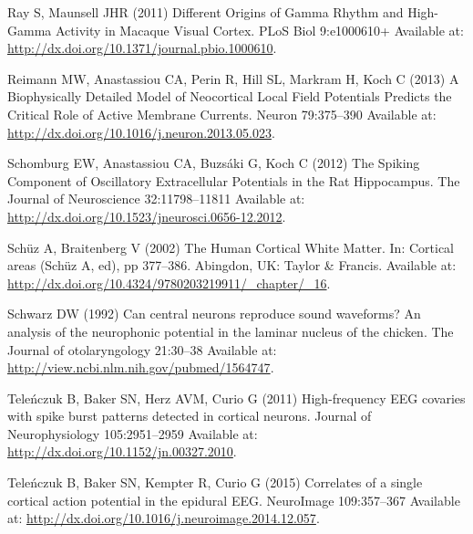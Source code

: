 \documentclass[]{article}
\begin{document}
\hypertarget{ref-Ray2011Different}{}
Ray S, Maunsell JHR (2011) Different Origins of Gamma Rhythm and
High-Gamma Activity in Macaque Visual Cortex. PLoS Biol 9:e1000610+
Available at: \url{http://dx.doi.org/10.1371/journal.pbio.1000610}.

\hypertarget{ref-Reimann2013Biophysically}{}
Reimann MW, Anastassiou CA, Perin R, Hill SL, Markram H, Koch C (2013) A
Biophysically Detailed Model of Neocortical Local Field Potentials
Predicts the Critical Role of Active Membrane Currents. Neuron
79:375--390 Available at:
\url{http://dx.doi.org/10.1016/j.neuron.2013.05.023}.

\hypertarget{ref-Schomburg2012Spiking}{}
Schomburg EW, Anastassiou CA, Buzsáki G, Koch C (2012) The Spiking
Component of Oscillatory Extracellular Potentials in the Rat
Hippocampus. The Journal of Neuroscience 32:11798--11811 Available at:
\url{http://dx.doi.org/10.1523/jneurosci.0656-12.2012}.

\hypertarget{ref-Schuz2002Human}{}
Schüz A, Braitenberg V (2002) The Human Cortical White Matter. In:
Cortical areas (Schüz A, ed), pp 377--386. Abingdon, UK: Taylor \&
Francis. Available at:
\url{http://dx.doi.org/10.4324/9780203219911/_chapter/_16}.

\hypertarget{ref-Schwarz1992Can}{}
Schwarz DW (1992) Can central neurons reproduce sound waveforms? An
analysis of the neurophonic potential in the laminar nucleus of the
chicken. The Journal of otolaryngology 21:30--38 Available at:
\url{http://view.ncbi.nlm.nih.gov/pubmed/1564747}.

\hypertarget{ref-Telenczuk2011Highfrequency}{}
Teleńczuk B, Baker SN, Herz AVM, Curio G (2011) High-frequency EEG
covaries with spike burst patterns detected in cortical neurons. Journal
of Neurophysiology 105:2951--2959 Available at:
\url{http://dx.doi.org/10.1152/jn.00327.2010}.

\hypertarget{ref-Telenczuk2015Correlates}{}
Teleńczuk B, Baker SN, Kempter R, Curio G (2015) Correlates of a single
cortical action potential in the epidural EEG. NeuroImage 109:357--367
Available at: \url{http://dx.doi.org/10.1016/j.neuroimage.2014.12.057}.
\end{document}
